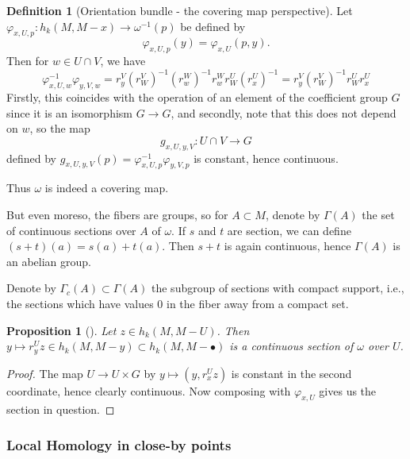 \documentclass[reqno]{amsart}
\newtheorem{proposition}[theorem]{Proposition}
\theoremstyle{definition}
\newtheorem{definition}[theorem]{Definition}
\theoremstyle{remark}
\begin{document}
\begin{definition}[Orientation bundle - the covering map perspective]
    Let
    $\varphi_{x,U,p} \colon
    h_k(M, M- x) \to 
    \omega^{-1}(p)$ be defined by
    \[
    \varphi_{x,U,p}(y) = 
    \varphi_{x,U}(p,y).
    \] 
    Then for $w \in U \cap V$, we have
    \[
    \varphi_{x,U,w}^{-1}
    \varphi_{y,V,w} = r_y^{V} (r_W^{V})^{-1} (r_w^{W})^{-1}
    r_w^{W} r_{W}^{U} (r_x^{U})^{-1} = 
    r_y^{V} (r_W^{V})^{-1} r_{W}^{U} r_x^{U}
    \] 
    Firstly, this coincides with the operation of
    an element of the coefficient group
    $G$ since it is an isomorphism
    $G \to G$, and secondly, 
    note that this does not depend on $w$,
    so the map
    \[
    g_{x,U,y,V} \colon U \cap V \to 
    G
    \]  
    defined by
    $g_{x,U,y,V}(p) = \varphi_{x,U,p}^{-1}
    \varphi_{y,V,p}$ is constant, hence continuous.\\
    \linebreak
    
    Thus $\omega$ is indeed a covering map.

    But even moreso, the fibers are groups, so
    for $A \subset M$, denote by
    $\Gamma(A)$ the set of continuous
    sections over $A$ of
    $\omega$. If
    $s$ and $t$ are section, we can define
    $(s+t)(a) = s(a) + t(a)$. Then
    $s+t$ is again continuous, hence $\Gamma(A)$ is an
    abelian group.

    Denote by $\Gamma_c(A) \subset 
    \Gamma(A)$ the subgroup of sections
    with compact support, i.e., the sections
    which have values $0$ in the fiber away from
    a compact set.
\end{definition}

\begin{proposition}[]\label{Prop:DJIXOZ}
    Let $z \in h_k(M, M- U)$. Then
    $y \mapsto r_y^{U} z
    \in h_k(M, M-y) \subset 
    h_k(M, M - \bullet)$ is a continuous section of $\omega$
    over $U$.
\end{proposition}


\begin{proof}
    The map
    $U \to U \times G$ by
    $y \mapsto (y, r_x^{U}z)$ is constant in the second coordinate,
    hence clearly continuous. Now composing with
    $\varphi_{x,U}$ gives us the section in question.
\end{proof}




\subsubsection{Local Homology in close-by points}
\end{document}
